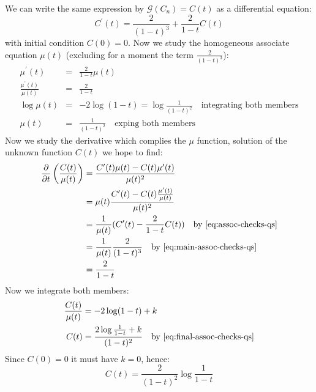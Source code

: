 We can write the same expression by $\mathcal{G} (C_n) = C(t)$ as a
differential equation:
\begin{equation}
  \label{eq:main-assoc-checks-qs}
  C^{\prime}(t) = \frac{2}{(1-t)^3} + \frac{2}{1-t} C(t)
\end{equation}
with initial condition $C(0) = 0$. Now we study the homogeneous
associate equation $\mu(t)$ (excluding for a moment the term $
\frac{2}{(1-t)^3}$):
\begin{eqnarray}
    \mu^{\prime} (t) &=&  \frac{2}{1-t} \mu (t)\\
    \frac{\mu^{\prime}(t)}{\mu (t)} &=& \frac{2}{1-t} \label{eq:assoc-checks-qs}\\
    \log\mu (t) &=& -2\log (1-t) = \log \frac{1}{(1-t)^2} \quad \text{
      integrating both members} \\
    \label{eq:final-assoc-checks-qs}
    \mu (t) &=& \frac{1}{(1-t)^2}\quad \text{
      exping both members}
\end{eqnarray}
Now we study the derivative which complies the $\mu$ function,
solution of the unknown function $C(t)$ we hope to find:
\begin{displaymath}
  \begin{split}
    \frac{\partial}{\partial t}\left( \frac{C(t)}{\mu (t)} \right) &=
    \frac{C^{\prime} (t)\mu (t) - C(t)\mu^{\prime} (t)}{\mu (t)^2} \\
    &= \mu (t)\frac{C^{\prime} (t) - C(t) \frac{\mu^{\prime} (t)}{\mu
        (t)} }{\mu (t)^2} \\
    &= \frac{1}{\mu (t)} (C^{\prime} (t) - \frac{2}{1-t}C(t) ) \quad
    \text{by \autoref{eq:assoc-checks-qs}}\\
    &= \frac{1}{\mu (t)}\frac{2}{(1-t)^3}\quad \text{by
      \autoref{eq:main-assoc-checks-qs}} \\
    &= \frac{2}{1-t}
  \end{split}
\end{displaymath}
Now we integrate both members:
\begin{displaymath}
  \begin{split}
    \frac{C(t)}{\mu (t)} &= -2\log (1-t) +k \\
    C(t) &= \frac{2\log{ \frac{1}{1-t} } + k}{(1-t)^2}\quad \text{by
      \autoref{eq:final-assoc-checks-qs}}
  \end{split}
\end{displaymath}
Since $C(0)=0$ it must have $k=0$, hence:
\begin{equation}
  C(t) = \frac{2}{(1-t)^2}\log{ \frac{1}{1-t} }
\end{equation}

